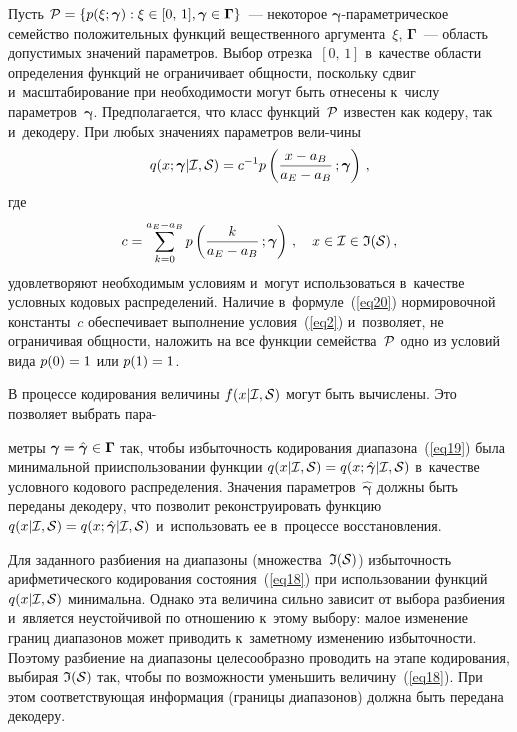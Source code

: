 \begin{multicols}{2}
Пусть ${\cal P}\hm=\{p(\xi;\boldsymbol{\gamma}):\xi\in[0,\,1], 
\boldsymbol{\gamma}\hm\in\boldsymbol{\Gamma}\}$~--- 
некоторое $\boldsymbol{\gamma}$-па\-ра\-мет\-ри\-че\-ское 
семейство положительных функций вещественного аргумента~$\xi$,  
$\boldsymbol{\Gamma}$~--- область допустимых значений параметров. 
Выбор отрезка~$[0,\,1]$  в~качестве области определения функций 
не ограничивает общности, поскольку сдвиг и~масштабирование при 
необходимости могут быть отнесены к~числу параметров~$\boldsymbol{\gamma}$. 
Предполагается, что класс функций~$\cal{P}$ известен как кодеру, так и~декодеру. 
При любых значениях параметров вели-\linebreak чины
\begin{equation}
q(x;\boldsymbol{\gamma}|{\cal I},{\cal S}) = 
c^{-1}p\left( \displaystyle\frac{\displaystyle x-a_B\mathstrut}{\displaystyle a_E-a_B\mathstrut}\,;\boldsymbol{\gamma}\right)\,,
\label{eq20}
\end{equation}
где
$$
c=\sum\limits_{k=0}^{a_E-a_B} p\left( \displaystyle\frac{\displaystyle k\mathstrut}{\displaystyle a_E-a_B\mathstrut}\,;\boldsymbol{\gamma}\right)\,,
\quad x\in{\cal I}\in{\frak I}({\cal S})\,,
$$
удовлетворяют необходимым условиям и~могут использоваться в~качестве 
условных кодовых распределений. Наличие в~формуле~(\ref{eq20}) нормировочной 
константы~$c$ обеспечивает выполнение условия~(\ref{eq2}) и~позволяет, не 
ограничивая общности, наложить на все функции семейства~${\cal P}$ одно из 
условий вида $p(0)\hm=1$ или $p(1)\hm=1$.

В процессе кодирования величины $f(x|{\cal I},{\cal S})$ могут быть вычислены. 
Это позволяет выбрать пара-\linebreak\vspace*{-12pt}

\pagebreak

\noindent
метры $\boldsymbol{\gamma}\hm=
\hat{\boldsymbol{\gamma}}\hm\in\boldsymbol{\Gamma}$ так, чтобы избыточность 
кодирования диапазона~(\ref{eq19}) была минимальной при\linebreak использовании 
функции $q(x|{\cal I},{\cal S}) \hm= q(x;\hat{\boldsymbol{\gamma}}|{\cal I},{\cal S})$ 
в~качестве условного кодового распределения. Значения 
параметров~$\hat{\boldsymbol{\gamma}}$ должны быть переданы декодеру, 
что позволит реконструировать функцию  $q(x|{\cal I},{\cal S}) \hm= 
q(x;\hat{\boldsymbol{\gamma}}|{\cal I},{\cal S})$ и~использовать 
ее в~процессе восстановления.

Для заданного разбиения на диапазоны (множества~${\frak I}({\cal S})$) 
избыточность арифметического кодирования состояния~(\ref{eq18}) при 
использовании функций $q(x|{\cal I},{\cal S})$ минимальна. Однако эта величина 
сильно зависит от выбора разбиения и~является неустойчивой по отношению к~этому выбору: 
малое изменение границ диапазонов может приводить к~заметному изменению избыточности. 
Поэтому разбиение на диапазоны целесообразно проводить на этапе кодирования, 
выбирая ${\frak I}({\cal S})$ так, чтобы по возможности уменьшить величину~(\ref{eq18}). 
При этом соответствующая информация (границы диапазонов) должна быть передана 
декодеру.


\end{multicols}
